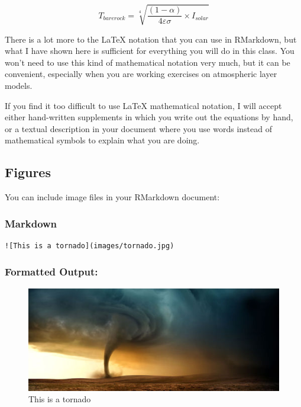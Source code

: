 \documentclass[
]{article}
\begin{document}
\[T_{bare rock} = \sqrt[4]{\frac{(1 - \alpha)}{4 \varepsilon \sigma} \times I_{solar}}\]

There is a lot more to the LaTeX notation that you can use in RMarkdown,
but what I have shown here is sufficient for everything you will do in
this class. You won't need to use this kind of mathematical notation
very much, but it can be convenient, especially when you are working
exercises on atmospheric layer models.

If you find it too difficult to use LaTeX mathematical notation, I will
accept either hand-written supplements in which you write out the
equations by hand, or a textual description in your document where you
use words instead of mathematical symbols to explain what you are doing.

\hypertarget{figures}{%
\subsection{Figures}\label{figures}}

You can include image files in your RMarkdown document:

\hypertarget{markdown-6}{%
\subsubsection{Markdown}\label{markdown-6}}

\begin{verbatim}
![This is a tornado](images/tornado.jpg)
\end{verbatim}

\hypertarget{formatted-output-5}{%
\subsubsection{Formatted Output:}\label{formatted-output-5}}

\begin{figure}
\centering
\includegraphics{images/tornado.jpg}
\caption{This is a tornado}
\end{figure}
\end{document}
